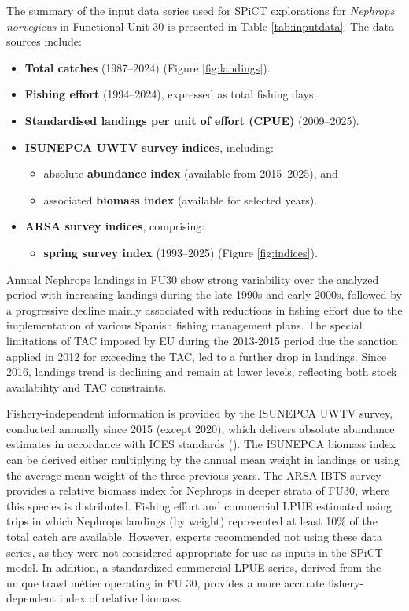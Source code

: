 \documentclass[
  12pt,
]{article}
\providecommand{\tightlist}{%
  \setlength{\itemsep}{0pt}\setlength{\parskip}{0pt}}
\begin{document}
The summary of the input data series used for SPiCT explorations for \emph{Nephrops norvegicus} in Functional Unit 30 is presented in Table \ref{tab:inputdata}. The data sources include:

\begin{itemize}
\tightlist
\item
  \textbf{Total catches} (1987--2024) (Figure \ref{fig:landings}).
\item
  \textbf{Fishing effort} (1994--2024), expressed as total fishing days.
\item
  \textbf{Standardised landings per unit of effort (CPUE)} (2009--2025).
\item
  \textbf{ISUNEPCA UWTV survey indices}, including:

  \begin{itemize}
  \tightlist
  \item
    absolute \textbf{abundance index} (available from 2015--2025), and
  \item
    associated \textbf{biomass index} (available for selected years).
  \end{itemize}
\item
  \textbf{ARSA survey indices}, comprising:

  \begin{itemize}
  \tightlist
  \item
    \textbf{spring survey index} (1993--2025) (Figure \ref{fig:indices}).
  \end{itemize}
\end{itemize}

Annual Nephrops landings in FU30 show strong variability over the analyzed period with increasing landings during the late 1990s and early 2000s, followed by a progressive decline mainly associated with reductions in fishing effort due to the implementation of various Spanish fishing management plans. The special limitations of TAC imposed by EU during the 2013-2015 period due the sanction applied in 2012 for exceeding the TAC, led to a further drop in landings. Since 2016, landings trend is declining and remain at lower levels, reflecting both stock availability and TAC constraints.

Fishery-independent information is provided by the ISUNEPCA UWTV survey, conducted annually since 2015 (except 2020), which delivers absolute abundance estimates in accordance with ICES standards (). The ISUNEPCA biomass index can be derived either multiplying by the annual mean weight in landings or using the average mean weight of the three previous years. The ARSA IBTS survey provides a relative biomass index for Nephrops in deeper strata of FU30, where this species is distributed. Fishing effort and commercial LPUE estimated using trips in which Nephrops landings (by weight) represented at least 10\% of the total catch are available. However, experts recommended not using these data series, as they were not considered appropriate for use as inputs in the SPiCT model. In addition, a standardized commercial LPUE series, derived from the unique trawl métier operating in FU 30, provides a more accurate fishery-dependent index of relative biomass.
\end{document}
